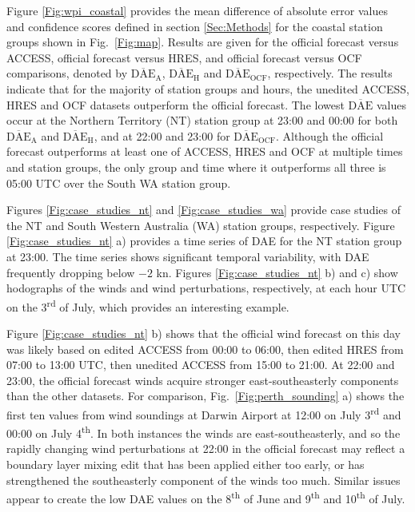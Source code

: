 \documentclass[twocol]{ametsoc}
\begin{document}
Figure \ref{Fig:wpi_coastal} provides the mean difference of absolute error values and confidence scores defined in section \ref{Sec:Methods} for the coastal station groups shown in Fig.~\ref{Fig:map}. Results are given for the official forecast versus ACCESS, official forecast versus HRES, and official forecast versus OCF comparisons, denoted by $\overline{\text{DAE}}_\text{A}$, $\overline{\text{DAE}}_\text{H}$ and $\overline{\text{DAE}}_\text{OCF}$, respectively. The results indicate that for the majority of station groups and hours, the unedited ACCESS, HRES and OCF datasets outperform the official forecast. The lowest $\overline{\text{DAE}}$ values occur at the Northern Territory (NT) station group at 23:00 and 00:00 for both $\overline{\text{DAE}}_\text{A}$ and $\overline{\text{DAE}}_\text{H}$, and at 22:00 and 23:00 for $\overline{\text{DAE}}_\text{OCF}$. Although the official forecast outperforms at least one of ACCESS, HRES and OCF at multiple times and station groups, the only group and time where it outperforms all three is 05:00 UTC over the South WA station group.

Figures \ref{Fig:case_studies_nt} and \ref{Fig:case_studies_wa} provide case studies of the NT and South Western Australia (WA) station groups, respectively. Figure \ref{Fig:case_studies_nt} a) provides a time series of DAE for the NT station group at 23:00. The time series shows significant temporal variability, with DAE frequently dropping below $-2$ kn. Figures \ref{Fig:case_studies_nt} b) and c) show hodographs of the winds and wind perturbations, respectively, at each hour UTC on the 3\textsuperscript{rd} of July, which provides an interesting example. 

Figure \ref{Fig:case_studies_nt} b) shows that the official wind forecast on this day was likely based on edited ACCESS from 00:00 to 06:00, then edited HRES from 07:00 to 13:00 UTC, then unedited ACCESS from 15:00 to 21:00. At 22:00 and 23:00, the official forecast winds acquire stronger east-southeasterly components than the other datasets. For comparison, Fig.~\ref{Fig:perth_sounding} a) shows the first ten values from wind soundings at Darwin Airport at 12:00 on July 3\textsuperscript{rd} and 00:00 on July 4\textsuperscript{th}. In both instances the winds are east-southeasterly, and so the rapidly changing wind perturbations at 22:00 in the official forecast may reflect a boundary layer mixing edit that has been applied either too early, or has strengthened the southeasterly component of the winds too much. Similar issues appear to create the low DAE values on the 8\textsuperscript{th} of June and 9\textsuperscript{th} and 10\textsuperscript{th} of July.
\end{document}
